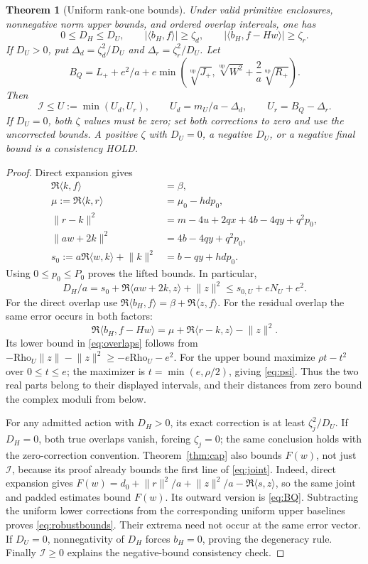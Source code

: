 \documentclass[11pt,a4paper]{article}
\newcommand{\ip}[2]{\langle #1,#2\rangle}
\newcommand{\norm}[1]{\lVert #1\rVert}
\newcommand{\Iresp}{\mathcal I}
\newcommand{\hold}{\textsf{HOLD}}
\newtheorem{theorem}{Theorem}[section]
\theoremstyle{definition}
\theoremstyle{remark}
\numberwithin{equation}{section}
\begin{document}
\begin{theorem}[Uniform rank-one bounds]\label{thm:robust}
Under valid primitive enclosures, nonnegative norm upper bounds, and
ordered overlap intervals, one has
\[
 0\le D_H\le D_U,\qquad
 |\ip{b_H}f|\ge\zeta_d,\qquad
 |\ip{b_H}{f-Hw}|\ge\zeta_r.
\]
If $D_U>0$, put $\Delta_d=\zeta_d^2/D_U$ and
$\Delta_r=\zeta_r^2/D_U$. Let
\begin{equation}\label{eq:BQ}
 B_Q=L_++e^2/a+
 e\min\left(\sqrt[\mathrm{up}]{J_+},
       \sqrt[\mathrm{up}]{W^2}+\frac2a\sqrt[\mathrm{up}]{R_+}\right).
\end{equation}
Then
\begin{equation}\label{eq:robustbounds}
 \Iresp\le U:=\min(U_d,U_r),\qquad
 U_d=m_U/a-\Delta_d,\qquad U_r=B_Q-\Delta_r.
\end{equation}
If $D_U=0$, both $\zeta$ values must be zero; set both corrections to
zero and use the uncorrected bounds. A positive $\zeta$ with $D_U=0$,
a negative $D_U$, or a negative final bound is a consistency \hold.
\end{theorem}
\begin{proof}
Direct expansion gives
\begin{align*}
 \Re\ip kf&=\beta,\\
 \mu:=\Re\ip kr&=\mu_0-hdp_0,\\
 \norm{r-k}^2&=m-4u+2qx+4b-4qy+q^2p_0,\\
 \norm{aw+2k}^2&=4b-4qy+q^2p_0,\\
 s_0:=a\Re\ip wk+\norm k^2&=b-qy+hdp_0.
\end{align*}
Using $0\le p_0\le P_0$ proves the lifted bounds. In particular,
\[
 D_H/a=s_0+\Re\ip{aw+2k}z+\norm z^2
       \le s_{0,U}+eN_U+e^2.
\]
For the direct overlap use
$\Re\ip{b_H}f=\beta+\Re\ip zf$.
For the residual overlap the same error occurs in both factors:
\begin{equation}\label{eq:resoverlap}
 \Re\ip{b_H}{f-Hw}
 =\mu+\Re\ip{r-k}z-\norm z^2.
\end{equation}
Its lower bound in \eqref{eq:overlaps} follows from
$-\mathrm{Rho}_U\norm z-\norm z^2
 \ge-e\mathrm{Rho}_U-e^2$.
For the upper bound maximize $\rho t-t^2$ over $0\le t\le e$;
the maximizer is $t=\min(e,\rho/2)$, giving \eqref{eq:psi}.
Thus the two real parts belong to their displayed intervals, and their
distances from zero bound the complex moduli from below.

For any admitted action with $D_H>0$, its exact correction is at least
$\zeta_j^2/D_U$. If $D_H=0$, both true overlaps vanish, forcing
$\zeta_j=0$; the same conclusion holds with the zero-correction
convention. Theorem~\ref{thm:cap} also bounds $F(w)$, not just
$\Iresp$, because its proof already bounds the first line of
\eqref{eq:joint}. Indeed, direct expansion gives
$F(w)=d_0+\norm r^2/a+\norm z^2/a-\Re\ip sz$,
so the same joint and padded estimates bound $F(w)$.
Its outward version is \eqref{eq:BQ}.
Subtracting the uniform lower corrections from the corresponding
uniform upper baselines proves \eqref{eq:robustbounds}. Their extrema
need not occur at the same error vector. If $D_U=0$, nonnegativity of
$D_H$ forces $b_H=0$, proving the degeneracy rule. Finally
$\Iresp\ge0$ explains the negative-bound consistency check.
\end{proof}
\end{document}
